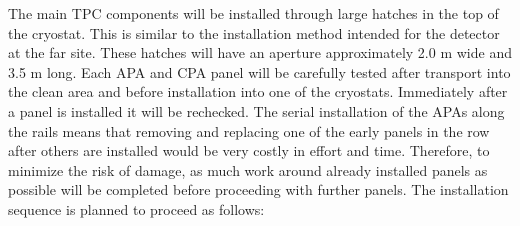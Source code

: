 The main TPC components will be installed through large hatches in the top of the cryostat.  This is 
similar to the installation method intended for the detector at the far site.  These hatches will have an 
aperture approximately 2.0 m wide and 3.5 m long.  Each APA and CPA panel will be carefully tested after transport into the clean area and before installation into one of the cryostats. Immediately after a panel is installed it will be rechecked. The serial installation of the APAs along the rails means that removing and replacing one of the early panels in the row after others are installed would be very costly in effort and time. Therefore, to minimize the risk of damage, as much work around already installed panels as possible will be completed before proceeding with further panels.
The installation sequence is planned to proceed as follows:

